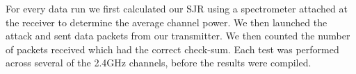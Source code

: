 \documentclass[sigconf, anonymous]{acmart}
\begin{document}
    
    
    
    
    
    
    
    
    
    
    


For every data run we first calculated our SJR using a spectrometer attached at the receiver to determine the average channel power. We then launched the attack and sent data packets from our transmitter. We then counted the number of packets received which had the correct check-sum. Each test was performed across several of the 2.4GHz channels, before the results were compiled. 
\end{document}
